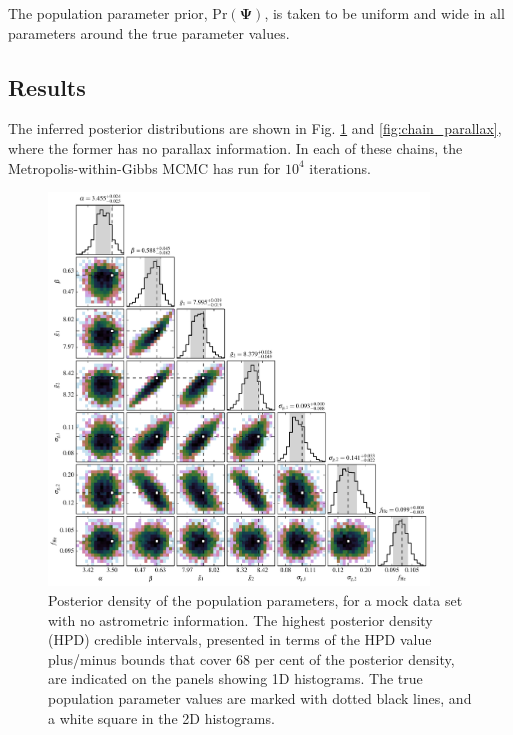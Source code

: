 \documentclass[fleqn,usenatbib]{mnras}
\newcommand{\popp}{\boldsymbol{\Psi}}
\newcommand{\pr}{\text{Pr}}
\begin{document}
The population parameter prior, $\pr(\popp)$, is taken to be uniform and wide in all parameters around the true parameter values.






\subsection{Results}\label{sec:results}

The inferred posterior distributions are shown in Fig. \ref{fig:chain} and \ref{fig:chain_parallax}, where the former has no parallax information. In each of these chains, the Metropolis-within-Gibbs MCMC has run for $10^4$ iterations.

\begin{figure}
	\includegraphics[width=0.9\textwidth]{toy_chain.pdf}
    \caption{ Posterior density of the population parameters, for a mock data set with no astrometric information. The highest posterior density (HPD) credible intervals, presented in terms of the HPD value plus/minus bounds that cover 68 per cent of the posterior density, are indicated on the panels showing 1D histograms. The true population parameter values are marked with dotted black lines, and a white square in the 2D histograms.}
    \label{fig:chain}
\end{figure}
\end{document}
